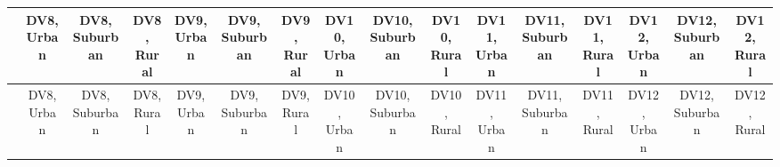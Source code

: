 
\begin{center}
\begin{small}
\begin{longtable}{l@{} c@{} c@{} c@{} c@{} c@{} c@{} c@{} c@{} c@{} c@{} c@{} c@{} c@{} c@{} c@{}}
\hline
 & \shortstack{\rule{0pt}{2.2ex}DV8,\\Urban} & \shortstack{\rule{0pt}{2.2ex}DV8,\\Suburban} & \shortstack{\rule{0pt}{2.2ex}DV8,\\Rural} & \shortstack{\rule{0pt}{2.2ex}DV9,\\Urban} & \shortstack{\rule{0pt}{2.2ex}DV9,\\Suburban} & \shortstack{\rule{0pt}{2.2ex}DV9,\\Rural} & \shortstack{\rule{0pt}{2.2ex}DV10,\\Urban} & \shortstack{\rule{0pt}{2.2ex}DV10,\\Suburban} & \shortstack{\rule{0pt}{2.2ex}DV10,\\Rural} & \shortstack{\rule{0pt}{2.2ex}DV11,\\Urban} & \shortstack{\rule{0pt}{2.2ex}DV11,\\Suburban} & \shortstack{\rule{0pt}{2.2ex}DV11,\\Rural} & \shortstack{\rule{0pt}{2.2ex}DV12,\\Urban} & \shortstack{\rule{0pt}{2.2ex}DV12,\\Suburban} & \shortstack{\rule{0pt}{2.2ex}DV12,\\Rural} \\
\hline
\endfirsthead
\hline
 & \shortstack{\rule{0pt}{2.2ex}DV8,\\Urban} & \shortstack{\rule{0pt}{2.2ex}DV8,\\Suburban} & \shortstack{\rule{0pt}{2.2ex}DV8,\\Rural} & \shortstack{\rule{0pt}{2.2ex}DV9,\\Urban} & \shortstack{\rule{0pt}{2.2ex}DV9,\\Suburban} & \shortstack{\rule{0pt}{2.2ex}DV9,\\Rural} & \shortstack{\rule{0pt}{2.2ex}DV10,\\Urban} & \shortstack{\rule{0pt}{2.2ex}DV10,\\Suburban} & \shortstack{\rule{0pt}{2.2ex}DV10,\\Rural} & \shortstack{\rule{0pt}{2.2ex}DV11,\\Urban} & \shortstack{\rule{0pt}{2.2ex}DV11,\\Suburban} & \shortstack{\rule{0pt}{2.2ex}DV11,\\Rural} & \shortstack{\rule{0pt}{2.2ex}DV12,\\Urban} & \shortstack{\rule{0pt}{2.2ex}DV12,\\Suburban} & \shortstack{\rule{0pt}{2.2ex}DV12,\\Rural} \\

\end{longtable}
\end{small}
\end{center}
